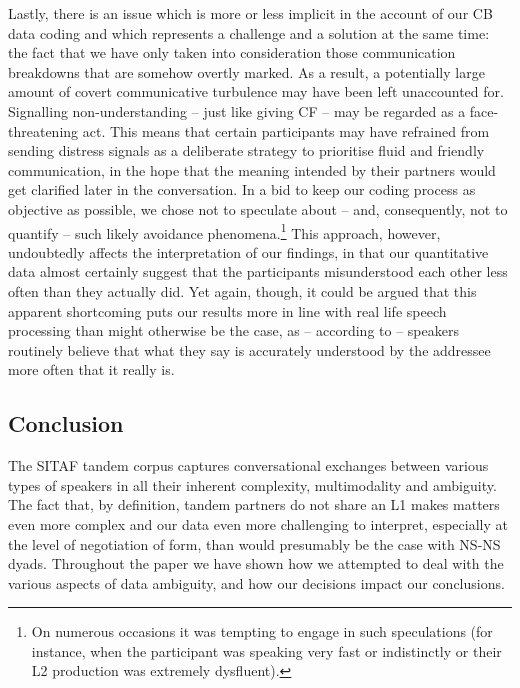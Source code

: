 \documentclass[output=paper,colorlinks,citecolor=brown,modfonts,nonflat]{../langscibook}
\begin{document}
\largerpage[-1]
Lastly, there is an issue which is more or less implicit in the account of our CB data coding and which represents a challenge and a solution at the same time: the fact that we have only taken into consideration those communication breakdowns that are somehow overtly marked. As a result, a potentially large amount of covert communicative turbulence may have been left unaccounted for. Signalling non-understanding – just like giving CF – may be regarded as a face-threatening act. This means that certain participants may have refrained from sending distress signals as a deliberate strategy to prioritise fluid and friendly communication, in the hope that the meaning intended by their partners would get clarified later in the conversation. In a bid to keep our coding process as objective as possible, we chose not to speculate about – and, consequently, not to quantify – such likely avoidance phenomena.\footnote{ {On numerous occasions it was tempting to engage in such speculations (for instance, when the participant was speaking very fast or indistinctly or their L2 production was extremely dysfluent).}} This approach, however, undoubtedly affects the interpretation of our findings, in that our quantitative data almost certainly suggest that the participants misunderstood each other less often than they actually did. Yet again, though, it could be argued that this apparent shortcoming puts our results more in line with real life speech processing than might otherwise be the case, as – according to \citet{Keysar2007} – speakers routinely believe that what they say is accurately understood by the addressee more often that it really is.

\subsection{Conclusion}\label{sec:scheuer:6.3}

The SITAF tandem corpus captures conversational exchanges between various types of speakers in all their inherent complexity, multimodality and ambiguity. The fact that, by definition, tandem partners do not share an L1 makes matters even more complex and our data even more challenging to interpret, especially at the level of negotiation of form, than would presumably be the case with NS-NS dyads. Throughout the paper we have shown how we attempted to deal with the various aspects of data ambiguity, and how our decisions impact our conclusions. 
\end{document}
